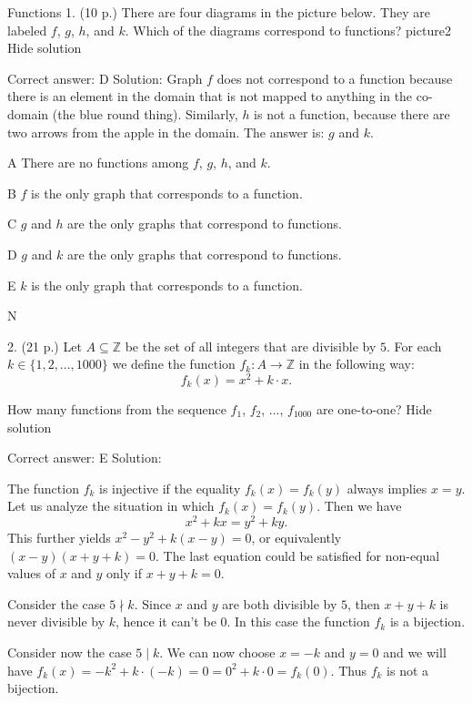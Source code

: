 Functions
1.	(10 p.)
	There are four diagrams in the picture below. They are labeled \( f \), \( g \), \( h \), and \( k \). Which of the diagrams correspond to functions?
picture2
Hide solution

Correct answer: D
Solution: Graph \( f \) does not correspond to a function because there is an element in the domain that is not mapped to anything in the co-domain (the blue round thing). Similarly, \( h \) is not a function, because there are two arrows from the apple in the domain. The answer is: \( g \) and \( k \).

   A    There are no functions among \( f \), \( g \), \( h \), and \( k \).

   B    \( f \) is the only graph that corresponds to a function.

   C    \( g \) and \( h \) are the only graphs that correspond to functions.

   D    \( g \) and \( k \) are the only graphs that correspond to functions.

   E    \( k \) is the only graph that corresponds to a function.

   N
	

2.	(21 p.)
	Let \( A\subseteq \mathbb Z \) be the set of all integers that are divisible by \( 5 \). For each \( k\in\{1,2,\dots, 1000\} \) we define the function \( f_k:A\to \mathbb Z \) in the following way: \[ f_k(x)=x^2+k\cdot x.\]

How many functions from the sequence \( f_1 \), \( f_2 \), ..., \( f_{1000} \) are one-to-one?
Hide solution

Correct answer: E
Solution:

The function \( f_k \) is injective if the equality \( f_k(x)=f_k(y) \) always implies \( x=y \). Let us analyze the situation in which \( f_k(x)=f_k(y) \). Then we have \[ x^2+kx=y^2+ky.\] This further yields \( x^2-y^2+k(x-y)=0 \), or equivalently \( (x-y)(x+y+k)=0 \). The last equation could be satisfied for non-equal values of \( x \) and \( y \) only if \( x+y+k=0 \).

Consider the case \( 5\nmid k \). Since \( x \) and \( y \) are both divisible by \( 5 \), then \( x+y+k \) is never divisible by \( k \), hence it can’t be 0. In this case the function \( f_k \) is a bijection.

Consider now the case \( 5\mid k \). We can now choose \( x=-k \) and \( y=0 \) and we will have \( f_k(x)=-k^2+k\cdot (-k)=0=0^2+k\cdot 0=f_k(0) \). Thus \( f_k \) is not a bijection.

